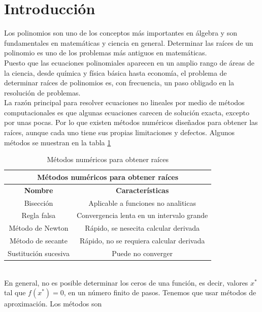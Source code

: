 \documentclass[12pt]{article}
\begin{document}
		\section*{\centering Introducción}\label{sec:Introducción}
			Los polinomios son uno de los conceptos más importantes en álgebra y son fundamentales en 
			matemáticas y ciencia en general. Determinar las raíces de un polinomio es uno de los problemas 
			más antiguos en matemáticas.\\
			Puesto que las ecuaciones polinomiales aparecen en un amplio rango de áreas de la ciencia, desde 
			química y física básica hasta economía, el problema de determinar raíces de polinomios es, con 
			frecuencia, un paso obligado en la resolución de problemas.\cite{bib:item1}\\
			La razón principal para resolver ecuaciones no lineales por medio de métodos computacionales es 
			que algunas ecuaciones carecen de solución exacta, excepto por unas pocas. Por lo que existen 
			métodos numéricos diseñados para obtener las raíces, aunque cada uno tiene sus propias 
			limitaciones y defectos. Algunos métodos se muestran en la tabla \ref{tab:1}\cite{bib:item2}\\
			\begin{table}[h!]
				\centering
				\begin{tabular}{|c|c|}
					\hline
					\multicolumn{2}{|c|}{\textbf{Métodos numéricos para obtener raíces}}\\
					\hline
					\textbf{Nombre} & \textbf{Características} \\\hline
					Bisección & Aplicable a funciones no analiticas \\\hline
					Regla falsa & Convergencia lenta en un intervalo grande \\\hline								
					Método de Newton & Rápido, se nesecita calcular derivada \\\hline
					Método de secante & Rápido, no se requiera calcular derivada \\\hline
					Sustitución sucesiva & Puede no converger \\\hline
				\end{tabular}
				\caption{Métodos numéricos para obtener raíces \cite{bib:item2}}
				\label{tab:1}
			\end{table}\\
			En general, no es posible determinar los ceros de una función, es decir, valores $ x^* $ tal que $f(x^*) = 0 $, 
			en un número finito de pasos. Tenemos que usar métodos de aproximación. Los métodos son 
\end{document}
